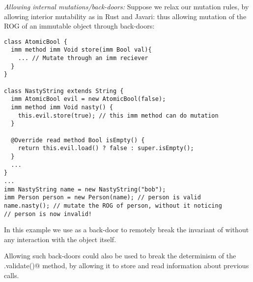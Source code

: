 \loseSpace
\noindent\textit{Allowing internal mutations/back-doors:}
Suppose we relax our mutation rules, by allowing interior mutability
as in Rust and Javari: thus allowing mutation of the ROG of an immutable object through back-doors:
\begin{lstlisting}
class AtomicBool {
  imm method imm Void store(imm Bool val){
    ... // Mutate through an imm reciever
  }
}

class NastyString extends String {
  imm AtomicBool evil = new AtomicBool(false);
  imm method imm Void nasty() {
    this.evil.store(true); // this imm method can do mutation
  }

  @Override read method Bool isEmpty() {
    return this.evil.load() ? false : super.isEmpty();
  }
  ...
}
...
imm NastyString name = new NastyString("bob");
imm Person person = new Person(name); // person is valid
name.nasty(); // mutate the ROG of person, without it noticing
// person is now invalid!
\end{lstlisting}

In this example we use \Q@AtomicBool@ as a back-door to remotely break the invariant of \Q@person@ without any interaction with the \Q@person@ object itself.


Allowing such back-doors could also be used to break the determinism of the \Q@.validate()@ method, by allowing it to store and read information about previous calls.

